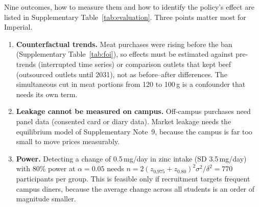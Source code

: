 Nine outcomes, how to measure them and how to identify the policy's effect are listed in Supplementary Table~\ref{tab:evaluation}. Three points matter most for Imperial.
\begin{enumerate}
\item \textbf{Counterfactual trends.} Meat purchases were rising before the ban (Supplementary Table~\ref{tab:foi}), so effects must be estimated against pre-trends (interrupted time series) or comparison outlets that kept beef (outsourced outlets until 2031), not as before--after differences. The simultaneous cut in meat portions from 120 to 100\,g is a confounder that needs its own term.
\item \textbf{Leakage cannot be measured on campus.} Off-campus purchases need panel data (consented card or diary data). Market leakage needs the equilibrium model of Supplementary Note~9, because the campus is far too small to move prices measurably.
\item \textbf{Power.} Detecting a change of 0.5\,mg/day in zinc intake (SD 3.5\,mg/day) with 80\% power at $\alpha=0.05$ needs $n = 2(z_{0.975}+z_{0.80})^2\sigma^2/\delta^2 = 770$ participants per group. This is feasible only if recruitment targets frequent campus diners, because the average change across all students is an order of magnitude smaller.
\end{enumerate}
